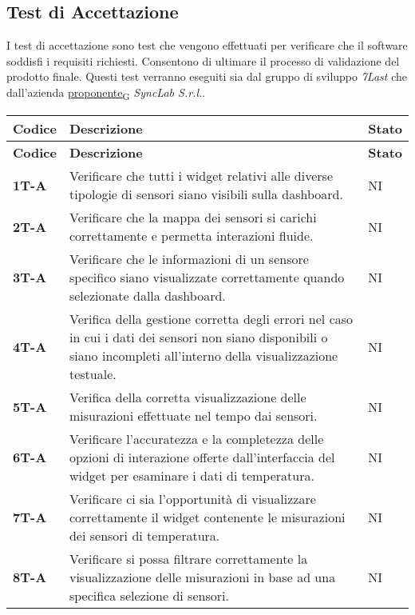 \subsection{Test di Accettazione}
I test di accettazione sono test che vengono effettuati per verificare che il software soddisfi i requisiti richiesti. Consentono di ultimare il processo di validazione del prodotto finale. Questi test verranno eseguiti sia dal gruppo di sviluppo \textit{7Last} che dall'azienda \href{https://7last.github.io/docs/rtb/documentazione-interna/glossario\#proponente}{proponente\textsubscript{G}} \textit{SyncLab S.r.l.}. \\
\begin{longtable}{|>{\raggedright\arraybackslash}m{}|>{\raggedright\arraybackslash}m{}|>{\raggedright\arraybackslash}m{}|}
	\hline
	\textbf{Codice} & \textbf{Descrizione} & \textbf{Stato} \\
	\hline
	\endfirsthead
	\hline
	\textbf{Codice} & \textbf{Descrizione} & \textbf{Stato} \\
	\endhead
	\textbf{1T-A}   & Verificare che tutti i widget relativi alle diverse tipologie di sensori siano visibili sulla dashboard. & NI\\
	\hline
	\textbf{2T-A}   & Verificare che la mappa dei sensori si carichi correttamente e permetta interazioni fluide. & NI\\
	\hline
	\textbf{3T-A}   & Verificare che le informazioni di un sensore specifico siano visualizzate correttamente quando selezionate dalla dashboard. & NI\\
	\hline
	\textbf{4T-A}   & Verifica della gestione corretta degli errori nel caso in cui i dati dei sensori non siano disponibili o siano incompleti all’interno della visualizzazione testuale. & NI\\
	\hline
	\textbf{5T-A}   & Verifica della corretta visualizzazione delle misurazioni effettuate nel tempo dai sensori. & NI\\
	\hline
	\textbf{6T-A}   & Verificare l’accuratezza e la completezza delle opzioni di interazione offerte dall’interfaccia del widget per esaminare i dati di temperatura. & NI\\
	\hline
	\textbf{7T-A}   & Verificare ci sia l’opportunità di visualizzare correttamente il widget contenente le misurazioni dei sensori di temperatura. 	& NI\\
	\hline
	\textbf{8T-A}   & Verificare si possa filtrare correttamente la visualizzazione delle misurazioni in base ad una specifica selezione di sensori. & NI\\

\end{longtable}
